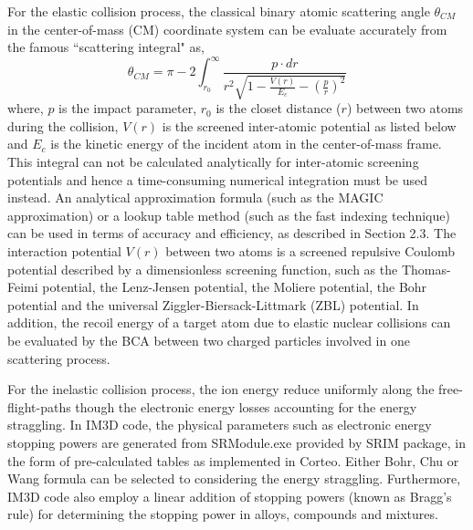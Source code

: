 For the elastic collision process, the classical binary atomic scattering angle $\theta_{CM}$ in the center-of-mass (CM) coordinate system can be evaluate accurately from the famous ``scattering integral" as,
\begin{equation}
\theta_{CM} = \pi - 2 \int_{r_0}^{\infty} \frac{p \cdot dr}{r^2 \sqrt{1 - \frac{V \left( r \right)}{E_c} - \left( \frac{p}{r} \right)^2}} \label{Eq.0}
\end{equation}
\noindent where, $p$ is the impact parameter, $r_0$ is the closet distance ($r$) between two atoms during the collision, $V\left( r \right)$ is the screened inter-atomic potential as listed below and $E_c$ is the kinetic energy of the incident atom in the center-of-mass frame. This integral can not be calculated analytically for inter-atomic screening potentials and hence a time-consuming numerical integration must be used instead\cite{Ziegler:2010}. An analytical approximation formula (such as the MAGIC approximation\cite{Ziegler:2010}) or a lookup table method (such as the fast indexing technique\cite{Schiettekatte:2008}) can be used in terms of accuracy and efficiency, as described in Section 2.3. The interaction potential $V \left( r \right)$ between two atoms is a screened repulsive Coulomb potential described by a dimensionless screening function, such as the Thomas-Feimi potential\cite{Sommerfeld:1932}, the Lenz-Jensen potential\cite{Lenz:1932}, the Moliere potential\cite{Moliere:1947}, the Bohr potential\cite{Bohr:1948} and the universal Ziggler-Biersack-Littmark (ZBL) potential\cite{Ziegler:2010}. In addition, the recoil energy of a target atom due to elastic nuclear collisions can be evaluated by the BCA between two charged particles involved in one scattering process.

For the inelastic collision process, the ion energy reduce uniformly along the free-flight-paths though the electronic energy losses accounting for the energy straggling. In IM3D code, the physical parameters such as electronic energy stopping powers are generated from SRModule.exe provided by SRIM package\cite{Ziegler:2004}, in the form of pre-calculated tables as implemented in Corteo\cite{Schiettekatte:2008}.
Either Bohr\cite{Bohr2:1948}, Chu\cite{Chu:1976} or Wang\cite{Yang:1991} formula can be selected to considering the energy straggling. Furthermore, IM3D code also employ a linear addition of stopping powers (known as Bragg's rule\cite{Bragg:1905}) for determining the stopping power in alloys, compounds and mixtures.

